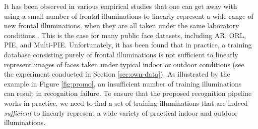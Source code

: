 It has been observed in various empirical studies that one can get away with
using a small number of frontal illuminations to linearly represent a wide
range of new frontal illuminations, when they are all taken under the same
laboratory conditions \cite{Georghiades2001-PAMI}. This is the case for many
public face datasets, including AR, ORL, PIE, and Multi-PIE.  Unfortunately, it
has been found that in practice, a training database consisting purely of
frontal illuminations is not sufficient to linearly represent images of faces
taken under typical indoor or outdoor conditions (see the experiment conducted
in Section \ref{sec:own-data}). As illustrated by the example in Figure
\ref{fig:promo}, an insufficient number of training illuminations can result in
recognition failure. To ensure that the proposed recognition pipeline works in
practice, we need to find a set of training illuminations that are indeed {\em
sufficient} to linearly represent a wide variety of practical indoor and
outdoor illuminations.


